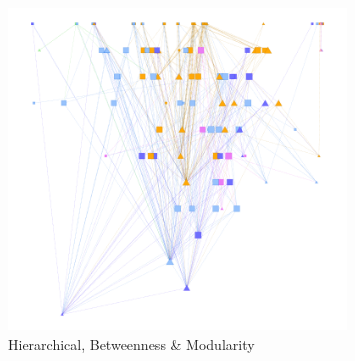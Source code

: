 \begin{figure}[p]
\centering
\includegraphics[width=0.8\textwidth]{img/regexp/hierarchical.png}
\caption{Hierarchical, Betweenness \& Modularity}\label{fig:regexp:hier}
\end{figure}

